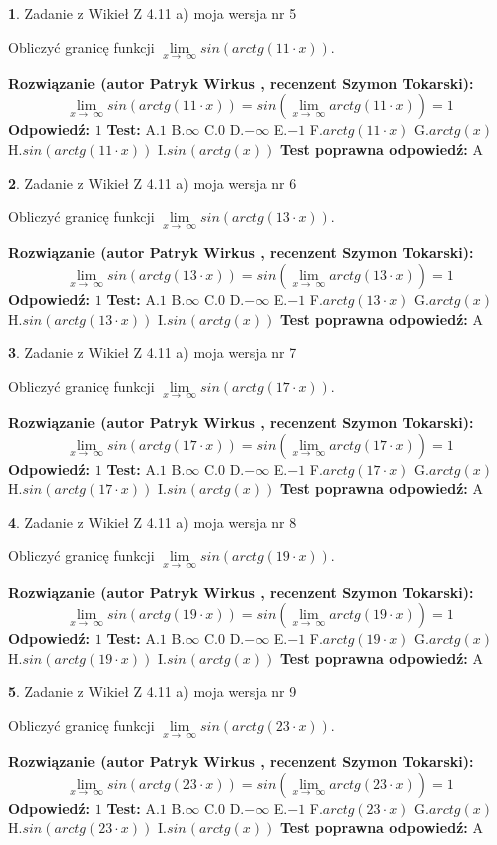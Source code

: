 \documentclass[12pt, a4paper]{article}
\theoremstyle{definition} %
\newtheorem{zad}{}
\newcommand{\zadStart}[1]{\begin{zad}#1\newline}
\newcommand{\zadStop}{\end{zad}}
\newcommand{\rozwStart}[2]{\noindent \textbf{Rozwiązanie (autor #1 , recenzent #2): }\newline}
\newcommand{\rozwStop}{\newline}
\newcommand{\odpStart}{\noindent \textbf{Odpowiedź:}\newline}
\newcommand{\odpStop}{\newline}
\newcommand{\testStart}{\noindent \textbf{Test:}\newline}
\newcommand{\testStop}{\newline}
\newcommand{\kluczStart}{\noindent \textbf{Test poprawna odpowiedź:}\newline}
\newcommand{\kluczStop}{\newline}
\begin{document}
\zadStart{Zadanie z Wikieł Z 4.11 a) moja wersja nr 5}

Obliczyć granicę funkcji  $\lim\limits_{x\to\ \infty}sin(arctg(11\cdot x))$.
\zadStop
\rozwStart{Patryk Wirkus}{Szymon Tokarski}
$$\lim\limits_{x\to\ \infty}sin(arctg(11\cdot x)) = sin(\lim\limits_{x\to\ \infty}arctg(11\cdot x)) = 1$$
\rozwStop
\odpStart
$1$
\odpStop
\testStart
A.$1$ B.$\infty$ C.$0$ D.$-\infty$ E.$-1$
F.$arctg(11\cdot x)$ G.$arctg(x)$
H.$sin(arctg(11\cdot x))$
I.$sin(arctg(x))$
\testStop
\kluczStart
A
\kluczStop



\zadStart{Zadanie z Wikieł Z 4.11 a) moja wersja nr 6}

Obliczyć granicę funkcji  $\lim\limits_{x\to\ \infty}sin(arctg(13\cdot x))$.
\zadStop
\rozwStart{Patryk Wirkus}{Szymon Tokarski}
$$\lim\limits_{x\to\ \infty}sin(arctg(13\cdot x)) = sin(\lim\limits_{x\to\ \infty}arctg(13\cdot x)) = 1$$
\rozwStop
\odpStart
$1$
\odpStop
\testStart
A.$1$ B.$\infty$ C.$0$ D.$-\infty$ E.$-1$
F.$arctg(13\cdot x)$ G.$arctg(x)$
H.$sin(arctg(13\cdot x))$
I.$sin(arctg(x))$
\testStop
\kluczStart
A
\kluczStop



\zadStart{Zadanie z Wikieł Z 4.11 a) moja wersja nr 7}

Obliczyć granicę funkcji  $\lim\limits_{x\to\ \infty}sin(arctg(17\cdot x))$.
\zadStop
\rozwStart{Patryk Wirkus}{Szymon Tokarski}
$$\lim\limits_{x\to\ \infty}sin(arctg(17\cdot x)) = sin(\lim\limits_{x\to\ \infty}arctg(17\cdot x)) = 1$$
\rozwStop
\odpStart
$1$
\odpStop
\testStart
A.$1$ B.$\infty$ C.$0$ D.$-\infty$ E.$-1$
F.$arctg(17\cdot x)$ G.$arctg(x)$
H.$sin(arctg(17\cdot x))$
I.$sin(arctg(x))$
\testStop
\kluczStart
A
\kluczStop



\zadStart{Zadanie z Wikieł Z 4.11 a) moja wersja nr 8}

Obliczyć granicę funkcji  $\lim\limits_{x\to\ \infty}sin(arctg(19\cdot x))$.
\zadStop
\rozwStart{Patryk Wirkus}{Szymon Tokarski}
$$\lim\limits_{x\to\ \infty}sin(arctg(19\cdot x)) = sin(\lim\limits_{x\to\ \infty}arctg(19\cdot x)) = 1$$
\rozwStop
\odpStart
$1$
\odpStop
\testStart
A.$1$ B.$\infty$ C.$0$ D.$-\infty$ E.$-1$
F.$arctg(19\cdot x)$ G.$arctg(x)$
H.$sin(arctg(19\cdot x))$
I.$sin(arctg(x))$
\testStop
\kluczStart
A
\kluczStop



\zadStart{Zadanie z Wikieł Z 4.11 a) moja wersja nr 9}

Obliczyć granicę funkcji  $\lim\limits_{x\to\ \infty}sin(arctg(23\cdot x))$.
\zadStop
\rozwStart{Patryk Wirkus}{Szymon Tokarski}
$$\lim\limits_{x\to\ \infty}sin(arctg(23\cdot x)) = sin(\lim\limits_{x\to\ \infty}arctg(23\cdot x)) = 1$$
\rozwStop
\odpStart
$1$
\odpStop
\testStart
A.$1$ B.$\infty$ C.$0$ D.$-\infty$ E.$-1$
F.$arctg(23\cdot x)$ G.$arctg(x)$
H.$sin(arctg(23\cdot x))$
I.$sin(arctg(x))$
\testStop
\kluczStart
A
\kluczStop
\end{document}

